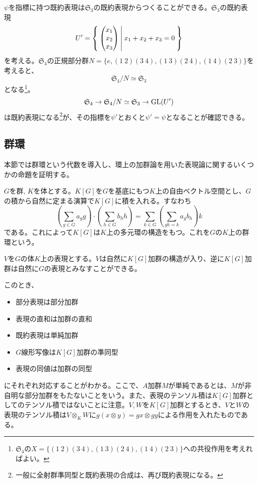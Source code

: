 \documentclass{ltjsreport}
\begin{document}
\begin{eg}
  $\psi$を指標に持つ既約表現は$\mathfrak{S}_3$の既約表現からつくることができる。$\mathfrak{S}_3$の既約表現
  \[
  U'=\left\{\:\begin{pmatrix} x_1\\x_2\\x_3 \end{pmatrix}\:\middle|\:x_1+x_2+x_3=0\:\right\}  
  \]
  を考える。$\mathfrak{S}_4$の正規部分群$N=\{e,(1\:2)(3\:4),(1\:3)(2\:4),(1\:4)(2\:3)\}$を考えると、
  \[
  \mathfrak{S}_4/N\simeq \mathfrak{S}_3  
  \]
  となる\footnote{
    $\mathfrak{S}_4$の$X=\{(1\:2)(3\:4),(1\:3)(2\:4),(1\:4)(2\:3)\}$への共役作用を考えればよい。
  }。
  \[
  \mathfrak{S}_4\rightarrow \mathfrak{S}_4/N\simeq \mathfrak{S}_3\rightarrow \text{GL}(U')
  \]
  は既約表現になる\footnote{
    一般に全射群準同型と既約表現の合成は、再び既約表現になる。
  }が、その指標を$\psi'$とおくと$\psi'=\psi$となることが確認できる。
\end{eg}



\subsection{群環}

本節では群環という代数を導入し、環上の加群論を用いた表現論に関するいくつかの命題を証明する。

\begin{defin}
  $G$を群, $K$を体とする。$K[G]$を$G$を基底にもつ$K$上の自由ベクトル空間とし、$G$の積から自然に定まる演算で$K[G]$に積を入れる。すなわち
  \[
  \left(\sum_{g\in G}a_gg\right)\cdot\left(\sum_{h\in G}b_hh\right)  =\sum_{k \in G}\left(\sum_{gh=k}a_gb_h\right)k
  \]
  である。これによって$K[G]$は$K$上の多元環の構造をもつ。これを$G$の$K$上の群環という。
\end{defin}

$V$を$G$の体$K$上の表現とする。$V$は自然に$K[G]$加群の構造が入り、逆に$K[G]$加群は自然に$G$の表現とみなすことができる。

このとき、
\begin{itemize}
  \item 部分表現は部分加群
  \item 表現の直和は加群の直和
  \item 既約表現は単純加群
  \item $G$線形写像は$K[G]$加群の準同型
  \item 表現の同値は加群の同型
\end{itemize}
にそれぞれ対応することがわかる。ここで、$A$加群$M$が単純であるとは、$M$が非自明な部分加群をもたないことをいう。また、表現のテンソル積は$K[G]$加群としてのテンソル積ではないことに注意。$V,W$を$K[G]$加群とするとき、$V$と$W$の表現のテンソル積は$V\otimes_{K}W$に$g(x\otimes y)=gx\otimes gy$による作用を入れたものである。
\end{document}
